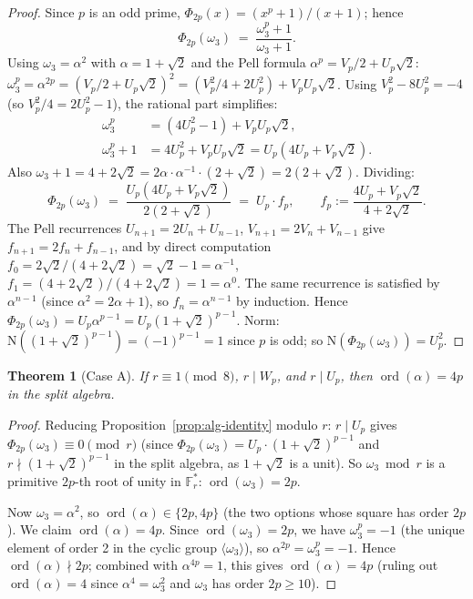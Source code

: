 \documentclass[11pt]{amsart}
\theoremstyle{plain}
\newtheorem{theorem}{Theorem}[section]
\theoremstyle{definition}
\theoremstyle{remark}
\numberwithin{equation}{section}
\newcommand{\ord}{\operatorname{ord}}
\newcommand{\F}{\mathbb{F}}
\begin{document}
\begin{proof}
Since $p$ is an odd prime, $\Phi_{2p}(x) = (x^p + 1)/(x + 1)$; hence
\[
  \Phi_{2p}(\omega_3) \;=\; \frac{\omega_3^p + 1}{\omega_3 + 1}.
\]
Using $\omega_3 = \alpha^2$ with $\alpha = 1 + \sqrt 2$ and the Pell formula $\alpha^p = V_p/2 + U_p \sqrt 2$: $\omega_3^p = \alpha^{2p} = (V_p/2 + U_p \sqrt 2)^2 = (V_p^2/4 + 2 U_p^2) + V_p U_p \sqrt 2$. Using $V_p^2 - 8 U_p^2 = -4$ (so $V_p^2/4 = 2 U_p^2 - 1$), the rational part simplifies:
\[
  \begin{aligned}
  \omega_3^p &= (4 U_p^2 - 1) + V_p U_p \sqrt 2,\\
  \omega_3^p + 1 &= 4 U_p^2 + V_p U_p \sqrt 2
                 = U_p (4 U_p + V_p \sqrt 2).
  \end{aligned}
\]
Also $\omega_3 + 1 = 4 + 2\sqrt 2 = 2 \alpha \cdot \alpha^{-1} \cdot (2 + \sqrt 2) = 2 (2 + \sqrt 2)$. Dividing:
\[
  \Phi_{2p}(\omega_3) \;=\; \frac{U_p (4 U_p + V_p \sqrt 2)}{2(2 + \sqrt 2)} \;=\; U_p \cdot f_p, \qquad f_p := \frac{4 U_p + V_p \sqrt 2}{4 + 2 \sqrt 2}.
\]
The Pell recurrences $U_{n+1} = 2 U_n + U_{n-1}$, $V_{n+1} = 2 V_n + V_{n-1}$ give $f_{n+1} = 2 f_n + f_{n-1}$, and by direct computation $f_0 = 2\sqrt 2/(4 + 2\sqrt 2) = \sqrt 2 - 1 = \alpha^{-1}$, $f_1 = (4 + 2\sqrt 2)/(4 + 2\sqrt 2) = 1 = \alpha^0$. The same recurrence is satisfied by $\alpha^{n-1}$ (since $\alpha^2 = 2\alpha + 1$), so $f_n = \alpha^{n-1}$ by induction. Hence $\Phi_{2p}(\omega_3) = U_p \alpha^{p-1} = U_p (1+\sqrt 2)^{p-1}$. Norm: $\mathrm{N}((1+\sqrt 2)^{p-1}) = (-1)^{p-1} = 1$ since $p$ is odd; so $\mathrm{N}(\Phi_{2p}(\omega_3)) = U_p^2$.
\end{proof}

\begin{theorem}[Case A]\label{thm:caseA}
If $r \equiv 1 \pmod 8$, $r \mid W_p$, and $r \mid U_p$, then $\ord(\alpha) = 4p$ in the split algebra.
\end{theorem}

\begin{proof}
Reducing Proposition~\ref{prop:alg-identity} modulo $r$: $r \mid U_p$ gives $\Phi_{2p}(\omega_3) \equiv 0 \pmod r$ (since $\Phi_{2p}(\omega_3) = U_p \cdot (1 + \sqrt 2)^{p-1}$ and $r \nmid (1 + \sqrt 2)^{p-1}$ in the split algebra, as $1 + \sqrt 2$ is a unit). So $\omega_3 \bmod r$ is a primitive $2p$-th root of unity in $\F_r^\ast$: $\ord(\omega_3) = 2 p$.

Now $\omega_3 = \alpha^2$, so $\ord(\alpha) \in \{2p, 4p\}$ (the two options whose square has order $2p$). We claim $\ord(\alpha) = 4p$. Since $\ord(\omega_3) = 2p$, we have $\omega_3^p = -1$ (the unique element of order 2 in the cyclic group $\langle\omega_3\rangle$), so $\alpha^{2p} = \omega_3^p = -1$. Hence $\ord(\alpha) \nmid 2p$; combined with $\alpha^{4p} = 1$, this gives $\ord(\alpha) = 4p$ (ruling out $\ord(\alpha) = 4$ since $\alpha^4 = \omega_3^2$ and $\omega_3$ has order $2p \geq 10$).
\end{proof}
\end{document}
